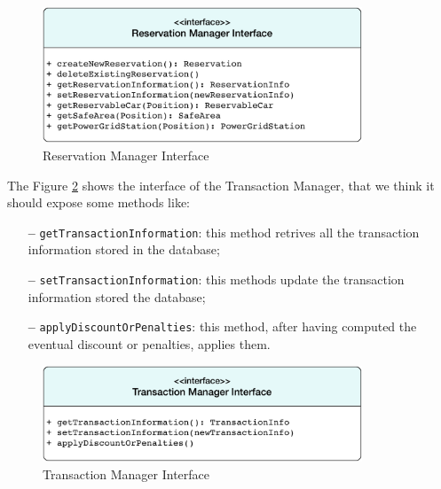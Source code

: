 \begin{figure}[htbp]
\centering
\vspace{36pt}
\includegraphics[width=0.85\textwidth]{Images/ReservationManager.pdf}
\vspace{10pt}
\caption{Reservation Manager Interface}
\label{fig:reservation}
\end{figure}
\clearpage

\newline
The Figure \ref{fig:transaction} shows the interface of the Transaction Manager, that we think it should expose some methods like:

\begin{itemize}
\item[\textbf{--}] \texttt{getTransactionInformation}: this method retrives all the transaction information stored in the database;
\item[\textbf{--}] \texttt{setTransactionInformation}: this methods update the transaction information stored the database;
\item[\textbf{--}] \texttt{applyDiscountOrPenalties}: this method, after having computed the eventual discount or penalties, applies them.
\end{itemize}

\begin{figure}[htbp]
\centering
\vspace{72pt}
\includegraphics[width=0.85\textwidth]{Images/TransactionManager.pdf}
\vspace{10pt}
\caption{Transaction Manager Interface}
\label{fig:transaction}
\end{figure}
\clearpage

